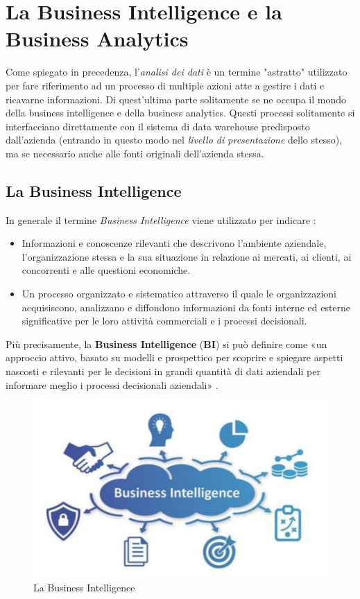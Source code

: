 \chapter{La Business Intelligence e la Business Analytics}
\label{ch:Business Intelligence and Analytics}

Come spiegato in precedenza, l'\textit{analisi dei dati} è un termine "astratto" utilizzato per fare riferimento ad un processo di multiple azioni atte a gestire i dati e ricavarne informazioni. Di quest'ultima parte solitamente se ne occupa il mondo della business intelligence e della business analytics. Questi processi solitamente si interfacciano direttamente con il sistema di data warehouse predisposto dall'azienda (entrando in questo modo nel \textit{livello di presentazione} dello stesso), ma se necessario anche alle fonti originali dell'azienda stessa.  

\section{La Business Intelligence}
In generale il termine \textit{Business Intelligence} viene utilizzato per indicare \cite{meauserement_of_bi}:

\begin{itemize}
    \item Informazioni e conoscenze rilevanti che descrivono l'ambiente aziendale, l'organizzazione stessa e la sua situazione in relazione ai mercati, ai clienti, ai concorrenti e alle questioni economiche.
    \item Un processo organizzato e sistematico attraverso il quale le organizzazioni acquisiscono, analizzano e diffondono informazioni da fonti interne ed esterne significative per le loro attività commerciali e i processi decisionali.
\end{itemize}

Più precisamente, la \textbf{Business Intelligence} (\textbf{BI}) si può definire come «un approccio attivo, basato su modelli e prospettico per scoprire e spiegare aspetti nascosti e rilevanti per le decisioni in grandi quantità di dati aziendali per informare meglio i processi decisionali aziendali» \cite{bi_strategic_intelligence}.

\begin{figure}[!h]
    \centering
    \includegraphics[width=0.75\linewidth]{figure//capitolo_3/Business Intelligence.pdf}
    \caption{La Business Intelligence}
    \label{fig:Business Intelligence}
\end{figure}

